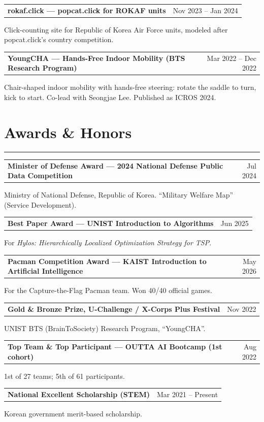 \documentclass[11pt,letterpaper]{article}
\makeatletter
\newcommand{\cvrow}[2]{%
  \noindent\begin{tabularx}{\linewidth}{@{}X r@{}}\textbf{#1} & {#2}\end{tabularx}\par
}
\newcommand{\cvsub}[1]{\noindent #1\par}
\makeatother
\begin{document}
\cvrow{rokaf.click --- popcat.click for ROKAF units}{Nov 2023 -- Jan 2024}
\cvsub{Click-counting site for Republic of Korea Air Force units, modeled after popcat.click's country competition.}
\vspace{4pt}

\cvrow{YoungCHA --- Hands-Free Indoor Mobility (BTS Research Program)}{Mar 2022 -- Dec 2022}
\cvsub{Chair-shaped indoor mobility with hands-free steering: rotate the saddle to turn, kick to start. Co-lead with Seongjae Lee. Published as ICROS 2024.}

\vspace{4pt}
\section*{Awards \& Honors}
\vspace{-4pt}
\rule{\textwidth}{0.5pt}\vspace{2pt}

\cvrow{Minister of Defense Award --- 2024 National Defense Public Data Competition}{Jul 2024}
\cvsub{Ministry of National Defense, Republic of Korea. ``Military Welfare Map'' (Service Development).}
\vspace{4pt}

\cvrow{Best Paper Award --- UNIST Introduction to Algorithms}{Jun 2025}
\cvsub{For \emph{Hylos: Hierarchically Localized Optimization Strategy for TSP}.}
\vspace{4pt}

\cvrow{Pacman Competition Award --- KAIST Introduction to Artificial Intelligence}{May 2026}
\cvsub{For the Capture-the-Flag Pacman team. Won 40/40 official games.}
\vspace{4pt}

\cvrow{Gold \& Bronze Prize, U-Challenge / X-Corps Plus Festival}{Nov 2022}
\cvsub{UNIST BTS (BrainToSociety) Research Program, ``YoungCHA''.}
\vspace{4pt}

\cvrow{Top Team \& Top Participant --- OUTTA AI Bootcamp (1st cohort)}{Aug 2022}
\cvsub{1st of 27 teams; 5th of 61 participants.}
\vspace{4pt}

\cvrow{National Excellent Scholarship (STEM)}{Mar 2021 -- Present}
\cvsub{Korean government merit-based scholarship.}

\vspace{4pt}
\end{document}
